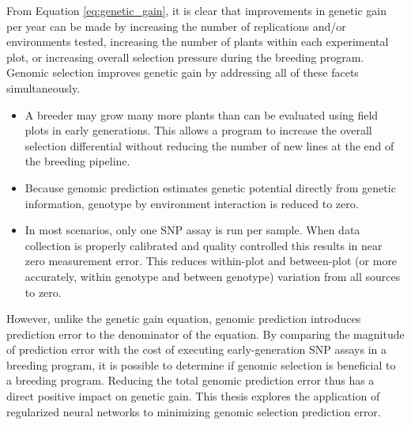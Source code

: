 From Equation \ref{eq:genetic_gain}, it is clear that improvements in genetic gain per year can
be made by increasing the number of replications and/or environments tested, increasing the 
number of plants within each experimental plot, or increasing overall selection pressure 
during the breeding program. Genomic selection improves genetic gain by addressing 
all of these facets simultaneously.

\begin{itemize}
    \item A breeder may grow many more plants than can be evaluated using field plots in 
          early generations. This allows a program to increase the overall selection 
          differential without reducing the number of new lines at the end of the breeding pipeline.
    \item Because genomic prediction estimates genetic potential directly from genetic information,
          genotype by environment interaction is reduced to zero.
    \item In most scenarios, only one SNP assay is run per sample. When data collection is properly
          calibrated and quality controlled this results in near zero measurement error. This reduces
          within-plot and between-plot (or more accurately, within genotype and between genotype) 
          variation from all sources to zero.
\end{itemize}

However, unlike the genetic gain equation, genomic prediction introduces prediction error to the 
denominator of the equation. By comparing the magnitude of prediction error with the cost
of executing early-generation SNP assays in a breeding program, it is possible to determine
if genomic selection is beneficial to a breeding program. Reducing the total genomic
prediction error thus has a direct positive impact on genetic gain. This thesis explores 
the application of regularized neural networks to minimizing genomic selection prediction error. 






